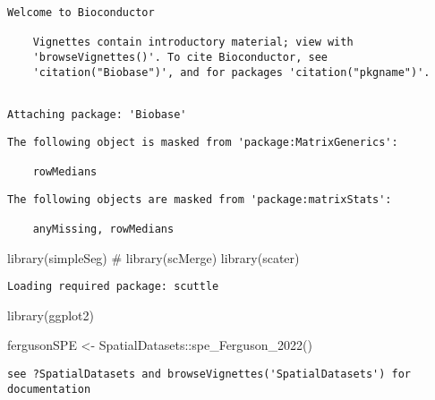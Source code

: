 \documentclass[
  letterpaper,
  DIV=11,
  numbers=noendperiod]{scrreprt}
\newenvironment{Shaded}{\begin{snugshade}}{\end{snugshade}}
\newcommand{\CommentTok}[1]{\textcolor[rgb]{0.37,0.37,0.37}{#1}}
\newcommand{\FunctionTok}[1]{\textcolor[rgb]{0.28,0.35,0.67}{#1}}
\newcommand{\NormalTok}[1]{\textcolor[rgb]{0.00,0.23,0.31}{#1}}
\newcommand{\OtherTok}[1]{\textcolor[rgb]{0.00,0.23,0.31}{#1}}
\newcommand{\SpecialCharTok}[1]{\textcolor[rgb]{0.37,0.37,0.37}{#1}}
\begin{document}
\begin{verbatim}
Welcome to Bioconductor

    Vignettes contain introductory material; view with
    'browseVignettes()'. To cite Bioconductor, see
    'citation("Biobase")', and for packages 'citation("pkgname")'.
\end{verbatim}

\begin{verbatim}

Attaching package: 'Biobase'
\end{verbatim}

\begin{verbatim}
The following object is masked from 'package:MatrixGenerics':

    rowMedians
\end{verbatim}

\begin{verbatim}
The following objects are masked from 'package:matrixStats':

    anyMissing, rowMedians
\end{verbatim}

\begin{Shaded}
\begin{Highlighting}[]
\FunctionTok{library}\NormalTok{(simpleSeg)}
\CommentTok{\# library(scMerge)}
\FunctionTok{library}\NormalTok{(scater)}
\end{Highlighting}
\end{Shaded}

\begin{verbatim}
Loading required package: scuttle
\end{verbatim}

\begin{Shaded}
\begin{Highlighting}[]
\FunctionTok{library}\NormalTok{(ggplot2)}
\end{Highlighting}
\end{Shaded}

\begin{Shaded}
\begin{Highlighting}[]
\NormalTok{fergusonSPE }\OtherTok{\textless{}{-}}\NormalTok{ SpatialDatasets}\SpecialCharTok{::}\FunctionTok{spe\_Ferguson\_2022}\NormalTok{()}
\end{Highlighting}
\end{Shaded}

\begin{verbatim}
see ?SpatialDatasets and browseVignettes('SpatialDatasets') for documentation
\end{verbatim}
\end{document}

